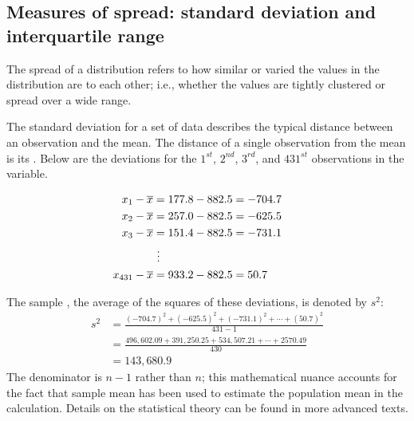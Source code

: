 \subsection{Measures of spread: standard deviation and interquartile range}
\label{measuresOfSpread}

The spread of a distribution refers to how similar or varied the values in the distribution are to each other; i.e., whether the values are tightly clustered or spread over a wide range.  

The standard deviation for a set of data describes the typical distance between an observation and the mean. The distance of a single observation from the mean is its . Below are the deviations for the $1^{st}$, $2^{nd}$, $3^{rd}$, and $431^{st}$ observations in the  variable.

\begin{align*}
x_1-\overline{x} &= 177.8 - 882.5 = -704.7 \hspace{5mm}\text{ } \\
x_2-\overline{x} &= 257.0 - 882.5 = -625.5 \\
x_3-\overline{x} &= 151.4 - 882.5 = -731.1 \\
&\ \vdots \\
x_{431}-\overline{x} &= 933.2 - 882.5 = 50.7
\end{align*}

The sample \label{varianceFirstDiscussed}, the average of the squares of these deviations, is denoted by $s^2$:
\begin{align*}
s^2 &= \frac{(-704.7)^2 + (-625.5)^2 + (-731.1)^2 + \cdots + (50.7)^2}{431-1} \\
&= \frac{496,602.09 + 391,250.25 + 534,507.21 + \cdots + 2570.49}{430} \\
&= 143,680.9
\end{align*}
The denominator is $n-1$ rather than $n$; this mathematical nuance accounts for the fact that sample mean has been used to estimate the population mean in the calculation. Details on the statistical theory can be found in more advanced texts. 

